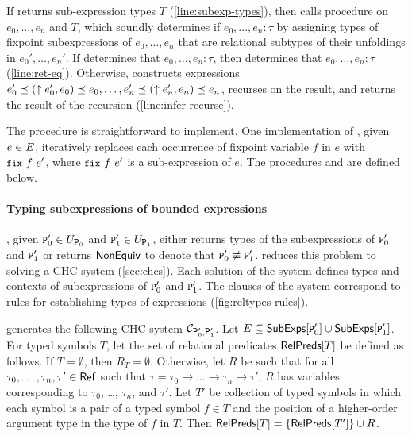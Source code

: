 If \inferbnd returns sub-expression types $T$
(\autoref{line:subexp-types}), then \inferaux calls procedure
\chkinductive on $e_0, \ldots, e_n$ and $T$, which soundly determines
if $e_0, \ldots, e_n : \tau$ by assigning types of fixpoint
subexpressions of $e_0, \ldots, e_n$ that are relational subtypes of
their unfoldings in $e_0', \ldots, e_n'$.
%
If \chkinductive determines that $e_0, \ldots, e_n : \tau$, then \sys
determines that $e_0, \ldots, e_n : \tau$ (\autoref{line:ret-eq}).
%
Otherwise, \chkinductive constructs expressions
$e_0' \preceq (\uparrow e_0', e_0) \preceq e_0, \ldots, e_n'
\preceq (\uparrow e_n', e_n) \preceq e_n$, recurses on the result,
and returns the result of the recursion
(\autoref{line:infer-recurse}).

The procedure \unfoldexp is straightforward to implement.
%
One implementation of \unfoldexp, given $e \in E$, iteratively
replaces each occurrence of fixpoint variable $f$ in $e$ with
$\fix{f}{e'}$, where $\fix{f}{e'}$ is a sub-expression of $e$.
%
The procedures \inferbnd and \chkinductive are defined below.

\paragraph{Typing subexpressions of bounded expressions}
\label{sec:type-bnd}
\verifybnd, given $\cc{P}_0' \in \unfoldings{ \cc{P}_0 }$ and
$\cc{P}_1' \in \unfoldings{ \cc{P}_1 }$, either returns types of the
subexpressions of $\cc{P}_0'$ and $\cc{P}_1'$ or returns $\mathsf{NonEquiv}$
to denote that $\cc{P}_0' \not\equiv \cc{P}_1'$.
%
\verifybnd reduces this problem to solving a CHC system
(\autoref{sec:chcs}).
%
Each solution of the system defines types and contexts of
subexpressions of $\cc{P}_0'$ and $\cc{P}_1'$.
%
The clauses of the system correspond to rules for establishing types
of expressions (\autoref{fig:reltypes-rules}).

%
\verifybnd generates the following CHC system $\mathcal{C}_{
  \cc{P}_0', \cc{P}_1' }$.
Let $E \subseteq \subexps{ \cc{P}_0' } \union \subexps{ \cc{P}_1' }$.
For typed symbols $T$, let the set of relational predicates
$\mathsf{RelPreds}[  T  ]$ be defined as follows.
If $T = \emptyset$, then $R_T = \emptyset$.
Otherwise, let $R$ be such that for all $\tau_0, \ldots, \tau_n, \tau'
\in \mathsf{Ref}$ such that $\tau = \tau_0 \rightarrow \ldots \rightarrow
\tau_n \rightarrow \tau'$, $R$ has variables corresponding to
$\tau_0$, \ldots, $\tau_n$, and $\tau'$.
%
Let $T'$ be collection of typed symbols in which each symbol is a pair
of a typed symbol $f \in T$ and the position of a higher-order
argument type in the type of $f$ in $T$.
%
Then $\mathsf{RelPreds}[  T  ] = \{  \mathsf{RelPreds}[  T'  ]  \} \cup  R $.

